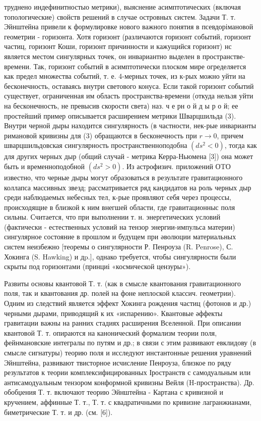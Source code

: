 \documentclass[10pt]{article}
\begin{document}
труднено индефинитностыо метрики), выяснение асимптотических (включая топологические) свойств решений в случае островных систем. Задачи Т. т. Эйнштейна привели к формулировке нового важного понятия в псевдорімановой геометрии - горизонта. Хотя горизонт (различаются горизонт событий, горизонт частиц, горизонт Коши, горизонт причинности и кажущийся горизонт) нс является местом сингулярных точек, он инвариантно выделен в пространстве-времени. Так, горизонт событий в асимптотически плоском мире огределяется как предел множества событий, т. е. 4-мерных точек, из к-рых можно уйти на бесконечность, оставаясь внутри светового конуса. Если такой горизонт событий существует, ограниченная им область пространства-времени (откуда нельзя уйти на бесконечность, не превысив скорости света) наз. ч е рн о й д ы р о й; ее простейший пример описывается расширением метрики Шварцшильда (3). Внутри черной дыры находится сингулярность (в частности, нек-рые инварианты римановой кривизны для (3) обращаются в бесконечность при $r \rightarrow 0$, причем шварцшильдовская сингулярность пространственноподобна $\left(d s^{2}<0\right)$, тогда как для других черных дыр (общий случай - метрика Керра-Ньюмена [3]) она может быть и временноподобной $\left(d s^{2}>0\right)$. Из астрофизич. приложений ОTО известно, что черные дыры могут образоваться в результате гравитационного коллапса массивных звезд; рассматривается ряд кандидатов на роль черных дыр среди наблюдаемых небесных тел, к-рые проявляют себя через процессы, происходящие в близкой к ним внегшей области, где гравитационныс поля сильны. Считается, что при выполнении т. н. энергетических условий (фактически - естественных условий на тензор энергии-импульса материи) сингулярное состояние в прошлом и будущем при әволюции материальных систем неизбежно [теоремы о сингулярности Р. Пенроуза (R. Penrose), С. Хокинга (S. Hawking) и дp.], однако требуется, чтобы сингулярности были скрыты под горизонтами (принциі «космической цензуры»).



Развиты основы квантовой Т. т. (как в смысле квантования гравитационного поля, так и квантования др. полей на фоне неплоской классич. геометрии). Одним из следствий является эффект Хокинга рождения частиц (фотонов и др.) черными дырами, приводящий к их «испарению». Квантовые әффекты гравитации важны на ранних стадиях расширения Вселенной. При описании квантовой Т. т. опираются на канонический формализм теории поля, фейнмановские интегралы по путям и др.; в связи с этим развивают евклидову (в смысле сигнатуры) теорию поля и исследуют инстантонные решения уравнений Эйнштейна, развивают твисторное исчисление Пенроуза, близкое по ряду результатов к теории комплексифицированных Іространств с самодуальным или антисамодуальным тензором конформной кривизны Вейля (H-пространства). Др. обобџения Т. т. включают теорию Эйнштейна - Картана с кривизной и кручением, аффинные Т. т., Т. т. с квадратичными по кривизне лагранжианами, биметрические Т. т. и др. (см. [6]).
\end{document}
